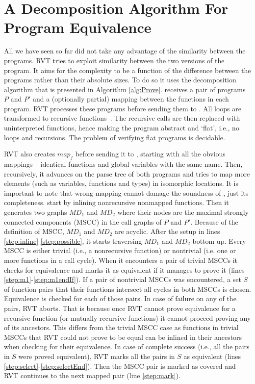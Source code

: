 \section{A Decomposition Algorithm For Program Equivalence}
All we have seen so far did not take any advantage of the similarity between the programs. RVT tries to exploit similarity between the two versions of the program. It aims for the complexity to be a function of the difference between the programs rather than their absolute sizes. To do so it uses the decomposition algorithm that is presented in Algorithm \ref{alg:Prove}.  receives a pair of programs $P$ and $P'$ and a (optionally partial) mapping between the functions in each program. RVT processes these programs before sending them to . All loops are transformed to recursive functions~\cite{DBLP:conf/vstte/StrichmanG05}. The recursive calls are then replaced with uninterpreted functions, hence making the program abstract and `flat', i.e., no loops and recursions. The problem of verifying flat programs is decidable. 

RVT also creates $map_f$ before sending it to , starting with all the obvious mappings – identical functions and global variables with the same name. Then, recursively, it advances on the parse tree of both programs and tries to map more elements (such as variables, functions and types) in isomorphic locations. It is important to note that wrong mapping cannot damage the soundness of , just its completeness. 
 start by inlining nonrecursive nonmapped functions. Then it generates two graphs $MD_1$ and $MD_2$ where their nodes are the maximal strongly connected components (MSCC) in the call graphs of $P$ and $P'$. Because of the definition of MSCC, $MD_1$ and $MD_2$ are acyclic. After the setup in lines \ref{step:inline}-\ref{step:possible}, it starts traversing $MD_1$ and $MD_2$ bottom-up. Every MSCC is either trivial (i.e., a nonrecursive function) or nontrivial (i.e. one or more functions in a call cycle). When it encounters a pair of trivial MSCCs it checks for equivalence and marks it as equivalent if it manages to prove it (lines \ref{step:m1}-\ref{step:m1endIf}). If a pair of nontrivial MSCCs was encountered, a set $S$ of function pairs that their functions intersect all cycles in both MSCCs is chosen. Equivalence is checked for each of those pairs. In case of failure on any of the pairs, RVT aborts. That is because once RVT cannot prove equivalence for a recursive function (or mutually recursive functions) it cannot proceed proving any of its ancestors. This differs from the trivial MSCC case as functions in trivial MSCCs that RVT could not prove to be equal can be inlined in their ancestors when checking for their equivalence. In case of complete success (i.e., all the pairs in $S$ were proved equivalent), RVT marks all the pairs in $S$ as equivalent (lines \ref{step:select}-\ref{step:selectEnd}). Then the MSCC pair is marked as covered and RVT continues to the next mapped pair (line \ref{step:mark}).

